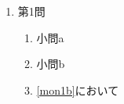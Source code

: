 \begin{enumerate}
	\item 第1問
	\begin{enumerate}
		\item 小問a
		\item\label{mon1b}小問b
		\item \ref{mon1b}において
	\end{enumerate}
\end{enumerate}
